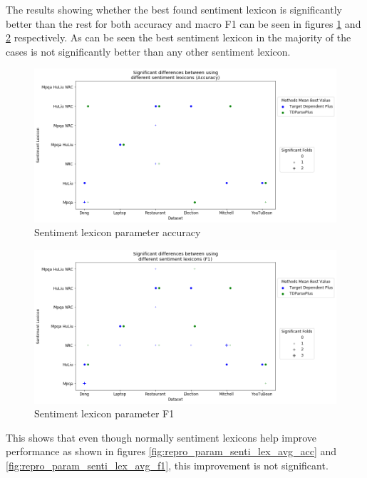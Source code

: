The results showing whether the best found sentiment lexicon is significantly better than the rest for both accuracy and macro F1 can be seen in figures \ref{fig:repro_param_senti_lex_sig_acc} and \ref{fig:repro_param_senti_lex_sig_f1} respectively. As can be seen the best sentiment lexicon in the majority of the cases is not significantly better than any other sentiment lexicon. 
\begin{figure}[!htb]
    \centering
    \includegraphics[scale=0.4]{images/reproducibility/Parameters/Sentiment_Lexicons/Sentiment_Lexicon_Sig_Plot_Accuracy.png}
    \caption{Sentiment lexicon parameter accuracy}
    \label{fig:repro_param_senti_lex_sig_acc}
\end{figure}
\begin{figure}[!htb]
    \centering
    \includegraphics[scale=0.4]{images/reproducibility/Parameters/Sentiment_Lexicons/Sentiment_Lexicon_Sig_Plot_F1.png}
    \caption{Sentiment lexicon parameter F1}
    \label{fig:repro_param_senti_lex_sig_f1}
\end{figure}
This shows that even though normally sentiment lexicons help improve performance as shown in figures \ref{fig:repro_param_senti_lex_avg_acc} and \ref{fig:repro_param_senti_lex_avg_f1}, this improvement is not significant.
